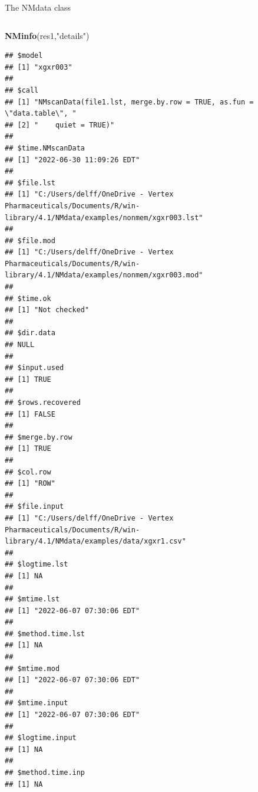 \documentclass[
  8pt,
  ignorenonframetext,
  aspectratio=169]{beamer}
\newenvironment{Shaded}{\begin{snugshade}}{\end{snugshade}}
\newcommand{\KeywordTok}[1]{\textcolor[rgb]{0.13,0.29,0.53}{\textbf{#1}}}
\newcommand{\NormalTok}[1]{#1}
\newcommand{\StringTok}[1]{\textcolor[rgb]{0.31,0.60,0.02}{#1}}
\begin{document}
\begin{frame}[fragile]{The NMdata class}
\begin{columns}[T]
\begin{column}{0.48\textwidth}
\begin{Shaded}
\begin{Highlighting}[]
\KeywordTok{NMinfo}\NormalTok{(res1,}\StringTok{"details"}\NormalTok{)}
\end{Highlighting}
\end{Shaded}

\begin{verbatim}
## $model
## [1] "xgxr003"
## 
## $call
## [1] "NMscanData(file1.lst, merge.by.row = TRUE, as.fun = \"data.table\", "
## [2] "    quiet = TRUE)"                                                   
## 
## $time.NMscanData
## [1] "2022-06-30 11:09:26 EDT"
## 
## $file.lst
## [1] "C:/Users/delff/OneDrive - Vertex Pharmaceuticals/Documents/R/win-library/4.1/NMdata/examples/nonmem/xgxr003.lst"
## 
## $file.mod
## [1] "C:/Users/delff/OneDrive - Vertex Pharmaceuticals/Documents/R/win-library/4.1/NMdata/examples/nonmem/xgxr003.mod"
## 
## $time.ok
## [1] "Not checked"
## 
## $dir.data
## NULL
## 
## $input.used
## [1] TRUE
## 
## $rows.recovered
## [1] FALSE
## 
## $merge.by.row
## [1] TRUE
## 
## $col.row
## [1] "ROW"
## 
## $file.input
## [1] "C:/Users/delff/OneDrive - Vertex Pharmaceuticals/Documents/R/win-library/4.1/NMdata/examples/data/xgxr1.csv"
## 
## $logtime.lst
## [1] NA
## 
## $mtime.lst
## [1] "2022-06-07 07:30:06 EDT"
## 
## $method.time.lst
## [1] NA
## 
## $mtime.mod
## [1] "2022-06-07 07:30:06 EDT"
## 
## $mtime.input
## [1] "2022-06-07 07:30:06 EDT"
## 
## $logtime.input
## [1] NA
## 
## $method.time.inp
## [1] NA
\end{verbatim}
\end{column}
\end{columns}
\end{frame}
\end{document}

